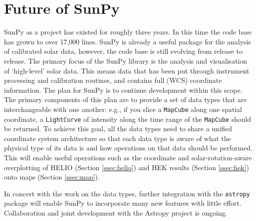 \section{Future of SunPy}\label{sec:future}

SunPy as a project has existed for roughly three years. In this time 
the code base has grown to over 17,000 lines. SunPy is already a 
useful package for the analysis of calibrated solar data, however, the code 
base is still evolving from release to release.
The primary focus of the 
SunPy library is the analysis and visualisation of `high-level' solar 
data. This means data that has been put through instrument processing 
and 
calibration routines, and contains full (WCS) coordinate information. 
The plan for SunPy is to continue development within this 
scope. The 
primary components of this plan are to provide a set of data types 
that are 
interchangeable with one another: e.g., if you slice a 
\texttt{MapCube} 
along one spatial coordinate, a \texttt{LightCurve} of intensity along the 
time range of 
the \texttt{MapCube} should be returned. To achieve this goal, all the 
data 
types need to share a unified coordinate system architecture so that 
each data 
type is aware of what the physical type of its data is and how 
operations on 
that data should be performed. This will enable useful operations
such as the coordinate and solar-rotation-aware 
overplotting of HELIO (Section \ref{ssec:helio}) and HEK
results (Section \ref{ssec:hek}) onto maps (Section \ref{ssec:map}).

In concert with the work on the data types, further integration with 
the 
\texttt{astropy} package will enable SunPy to incorporate many new features
with little effort. Collaboration and joint development with the 
Astropy project \citep{theastropycollaboration2013} is ongoing.
